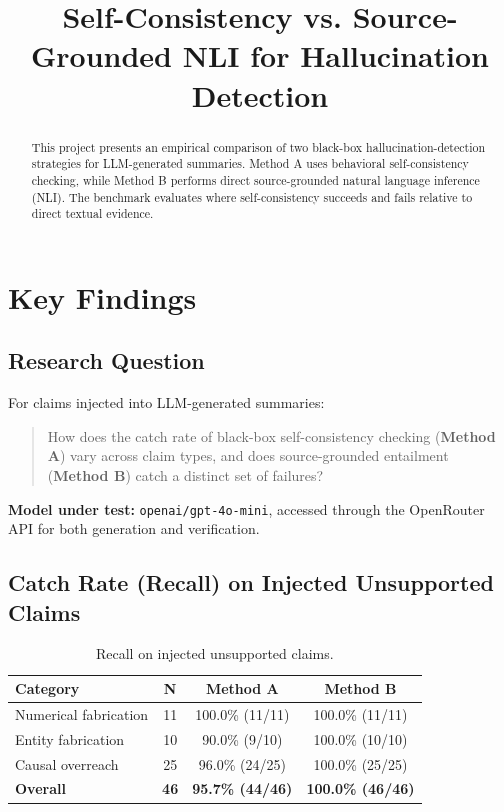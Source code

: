 \documentclass[11pt,a4paper]{article}
\title{\textbf{Self-Consistency vs. Source-Grounded NLI for Hallucination Detection}}
\author{}
\date{}
\begin{document}
\maketitle

\begin{abstract}
This project presents an empirical comparison of two black-box hallucination-detection strategies for LLM-generated summaries. Method A uses behavioral self-consistency checking, while Method B performs direct source-grounded natural language inference (NLI). The benchmark evaluates where self-consistency succeeds and fails relative to direct textual evidence.
\end{abstract}

\section{Key Findings}

\subsection{Research Question}

For claims injected into LLM-generated summaries:

\begin{quote}
How does the catch rate of black-box self-consistency checking
(\textbf{Method A}) vary across claim types, and does source-grounded
entailment (\textbf{Method B}) catch a distinct set of failures?
\end{quote}

\textbf{Model under test:} \texttt{openai/gpt-4o-mini}, accessed through the OpenRouter API for both generation and verification.

\subsection{Catch Rate (Recall) on Injected Unsupported Claims}

\begin{table}[h]
\centering
\begin{tabular}{lccc}
\toprule
\textbf{Category} & \textbf{N} & \textbf{Method A} & \textbf{Method B} \\
\midrule
Numerical fabrication & 11 & 100.0\% (11/11) & 100.0\% (11/11) \\
Entity fabrication & 10 & 90.0\% (9/10) & 100.0\% (10/10) \\
Causal overreach & 25 & 96.0\% (24/25) & 100.0\% (25/25) \\
\midrule
\textbf{Overall} & \textbf{46} & \textbf{95.7\% (44/46)} & \textbf{100.0\% (46/46)} \\
\bottomrule
\end{tabular}
\caption{Recall on injected unsupported claims.}
\end{table}
\end{document}
